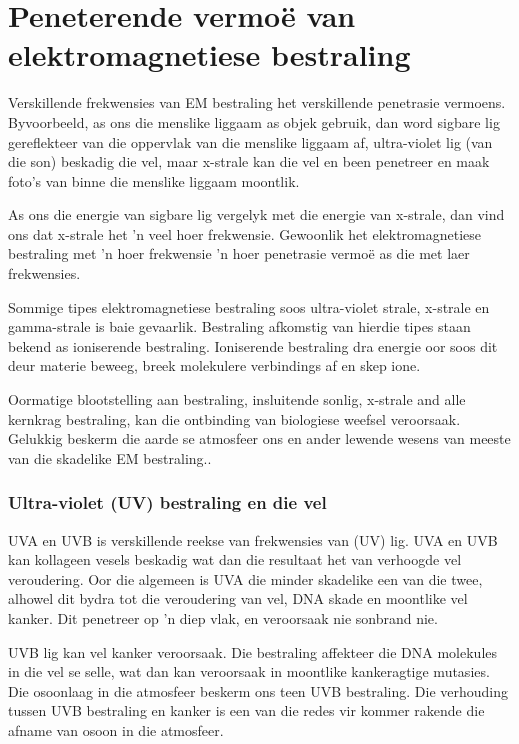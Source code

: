            \section{Peneterende vermo\"e van elektromagnetiese bestraling}
            \nopagebreak
      \label{m38779*id189450}Verskillende frekwensies van EM bestraling het verskillende penetrasie vermoens. Byvoorbeeld, as ons die menslike liggaam as objek gebruik, dan word sigbare lig gereflekteer van die oppervlak van die menslike liggaam af, ultra-violet lig (van die son) beskadig die vel, maar x-strale kan die vel en been penetreer en maak foto's van binne die menslike liggaam moontlik. \par 
      \label{m38779*id189457} As ons die energie van sigbare lig vergelyk met die energie van x-strale, dan vind ons dat x-strale het 'n veel hoer frekwensie. Gewoonlik het elektromagnetiese bestraling met 'n hoer frekwensie 'n hoer penetrasie vermo\"e as die met laer frekwensies. \par 
      \label{m38779*id189462} Sommige tipes elektromagnetiese bestraling soos ultra-violet strale, x-strale en gamma-strale is baie gevaarlik. Bestraling afkomstig van hierdie tipes staan bekend as ioniserende bestraling. Ioniserende bestraling dra energie oor soos dit deur materie beweeg, breek molekulere verbindings af en skep ione. \par 
      \label{m38779*id189468} Oormatige blootstelling aan bestraling, insluitende sonlig, x-strale and alle kernkrag bestraling, kan die ontbinding van biologiese weefsel veroorsaak. Gelukkig beskerm die aarde se atmosfeer ons en ander lewende wesens van meeste van die skadelike EM bestraling..\par 
      \label{m38779*uid17}
            \subsubsection*{Ultra-violet (UV) bestraling en die vel}
            \nopagebreak
        \label{m38779*id189482} UVA en UVB is verskillende reekse van frekwensies van (UV) lig. UVA en UVB kan kollageen vesels beskadig wat dan die resultaat het van verhoogde vel veroudering. Oor die algemeen is UVA die minder skadelike een van die twee, alhowel dit bydra tot die veroudering van vel, DNA skade en moontlike vel kanker. Dit penetreer op 'n diep vlak, en veroorsaak nie sonbrand nie. \par 
        \label{m38779*id189490}UVB lig kan vel kanker veroorsaak. Die bestraling affekteer die DNA molekules in die vel se selle, wat dan kan veroorsaak in moontlike kankeragtige mutasies. Die osoonlaag in die atmosfeer beskerm ons teen UVB bestraling. Die verhouding tussen UVB bestraling en kanker is een van die redes vir kommer rakende die afname van osoon in die atmosfeer. \par 
        
